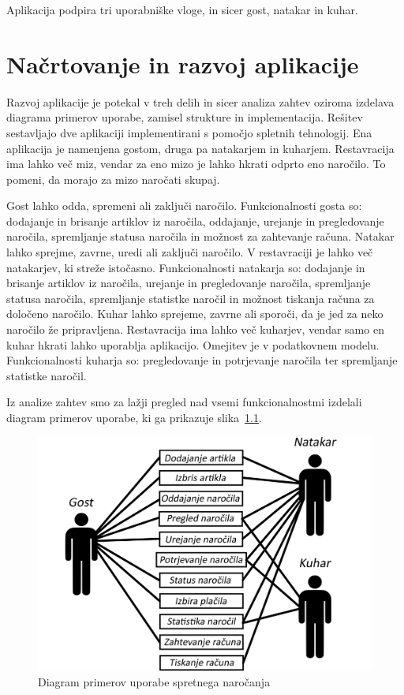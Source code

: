 \documentclass[a4paper, 12pt]{book}
\begin{document}
Aplikacija podpira tri uporabniške vloge, in sicer gost, natakar in kuhar. 

\chapter{Načrtovanje in razvoj aplikacije}

Razvoj aplikacije je potekal v treh delih in sicer analiza zahtev oziroma izdelava diagrama primerov uporabe, zamisel strukture in implementacija.
Rešitev sestavljajo dve aplikaciji implementirani s pomočjo spletnih tehnologij. Ena aplikacija je namenjena gostom, druga pa natakarjem in kuharjem. Restavracija ima lahko več miz, vendar za eno mizo je lahko hkrati odprto eno naročilo. To pomeni, da morajo za mizo naročati skupaj. 

Gost lahko odda, spremeni ali zaključi naročilo. Funkcionalnosti gosta so: dodajanje in brisanje artiklov iz naročila, oddajanje, urejanje in pregledovanje naročila, spremljanje statusa naročila in možnost za zahtevanje računa. Natakar lahko sprejme, zavrne, uredi ali zaključi naročilo. V restavraciji je lahko več natakarjev, ki streže istočasno. Funkcionalnosti natakarja so: dodajanje in brisanje artiklov iz naročila, urejanje in pregledovanje naročila, spremljanje statusa naročila, spremljanje statistke naročil in možnost tiskanja računa za določeno naročilo. Kuhar lahko sprejeme, zavrne ali sporoči, da je jed za neko naročilo že pripravljena. Restavracija ima lahko več kuharjev, vendar samo en kuhar hkrati lahko uporablja aplikacijo. Omejitev je v podatkovnem modelu. Funkcionalnosti kuharja so: pregledovanje in potrjevanje naročila ter spremljanje statistke naročil.

Iz analize zahtev smo za lažji pregled nad vsemi funkcionalnostmi izdelali diagram primerov uporabe, ki ga prikazuje slika~\ref{FunkVloge}.

\begin{figure}[!htb]
\begin{center}
\includegraphics[width=11.5cm]{Skica2.png}
\end{center}
\caption{Diagram primerov uporabe spretnega naročanja}
\label{FunkVloge}
\end{figure}
\end{document}

